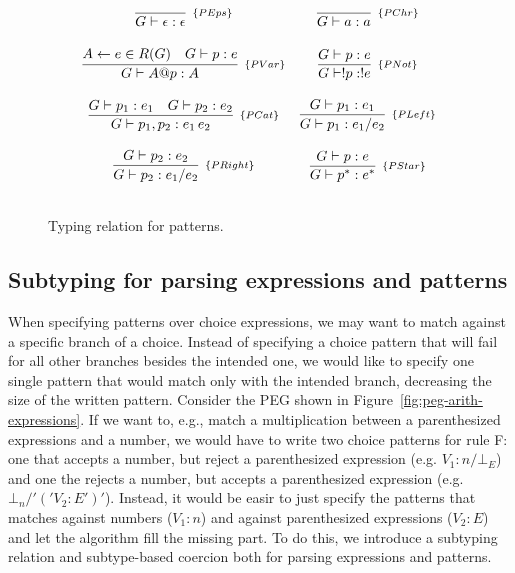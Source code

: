 \begin{figure}[H]
  \[
    \begin{array}{cc}
      \infer[_{\{PEps\}}]{G \vdash \epsilon : \epsilon}{} &
      \infer[_{\{PChr\}}]{G\vdash a : a}{} \\ \\
      \infer[_{\{PVar\}}]{ G \vdash A@p : A}
                      {A \leftarrow e \in R(G) & G\vdash p : e} &
      \infer[_{\{PNot\}}]{G\vdash !p: ! e}{G\vdash p : e}\\ \\
      \infer[_{\{PCat\}}]{G\vdash p_1, p_2 : e_1\,e_2}
                      {G\vdash  p_1 : e_1 & G\vdash p_2 : e_2} &
      \infer[_{\{PLeft\}}]{G\vdash p_1 : e_1 / e_2}
                       {G\vdash p_1 : e_1} \\ \\
      \infer[_{\{PRight\}}]{G\vdash p_2 : e_1 / e_2}
                       {G\vdash p_2 : e_2} &
      \infer[_{\{PStar\}}]{G \vdash  p^ * : e^*}{G \vdash p : e}\\ \\
   \end{array}
  \]
  \centering
  \caption{Typing relation for patterns.}
  \label{fig:pattern-typing}
\end{figure}

\subsection{Subtyping for parsing expressions and patterns}

When specifying patterns over choice expressions, we may want to match against 
a specific branch of a choice. Instead of specifying a choice pattern that will 
fail for all other branches besides the intended one, we would like to specify 
one single pattern that would match only with the intended branch, decreasing 
the size of the written pattern. 
Consider the PEG shown in Figure~\ref{fig:peg-arith-expressions}. If we want to, 
e.g., match a multiplication between a parenthesized expressions and a number, 
we would have to write two choice patterns for rule F: one that accepts a number, 
but reject a parenthesized expression (e.g. \(V_1:n / \bot_E\)) and one the rejects 
a number, but accepts a parenthesized expression (e.g. \(\bot_n / '(' V_2:E ')'\)).
Instead, it would be easir to just specify the patterns that matches against numbers
(\(V_1:n\)) and against parenthesized expressions (\(V_2:E\)) and let the algorithm
fill the missing part.
To do this, we introduce a subtyping relation and subtype-based coercion both 
for parsing expressions and patterns.

